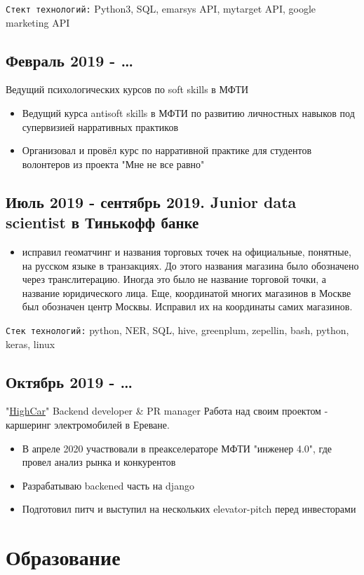 \documentclass[11pt]{article}
\begin{document}
\texttt{Стект технологий:}
Python3, SQL, emarsys API, mytarget API, google marketing API
\subsection{Февраль 2019 - \ldots{}}
\label{sec:org9d4dfa9}
Ведущий психологических курсов по soft skills в МФТИ
\begin{itemize}
\item Ведущий курса antisoft skills в МФТИ по развитию личностных навыков под супервизией нарративных практиков
\item Организовал и провёл курс по нарративной практике для студентов волонтеров из проекта "Мне не все равно"
\end{itemize}
\subsection{Июль 2019 - сентябрь 2019. Junior data scientist в Тинькофф банке}
\label{sec:org15cb8f7}
\begin{itemize}
\item исправил геоматчинг и названия торговых точек на официальные, понятные, на русском языке в транзакциях. До этого названия магазина было обозначено через транслитерацию. Иногда это было не название торговой точки, а название юридического лица. Еще, координатой многих магазинов в Москве был обозначен центр Москвы. Исправил их на координаты самих магазинов.
\end{itemize}

\texttt{Cтек технологий:} python, NER, SQL, hive, greenplum, zepellin, bash, python, keras, linux
\subsection{Октябрь 2019 - \ldots{}}
\label{sec:org5369fc9}
"\href{https://docs.google.com/presentation/d/1AiwyzLKDgDXIaclUwoyGgT-VDJMtJYJQqAMVfbNlB40/edit\#slide=id.p1}{HighCar}"
Backend developer \& PR manager
Работа над своим проектом - каршеринг электромобилей в Ереване.
\begin{itemize}
\item В апреле 2020 участвовали в преакселераторе МФТИ "инженер 4.0", где провел анализ рынка и конкурентов
\item Разрабатываю backened часть на django
\item Подготовил питч и выступил на нескольких elevator-pitch перед инвесторами
\end{itemize}
\section{Образование}
\label{sec:org92af181}
\end{document}
